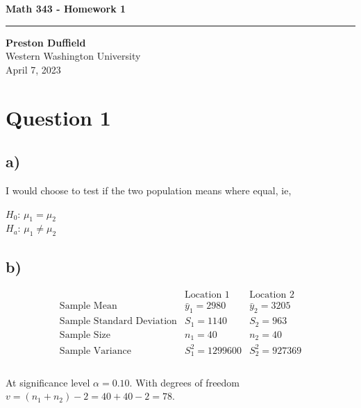 \documentclass{article}
\begin{document}
\noindent
\begin{minipage}[t]{0.6\textwidth}
    \begin{flushleft}
        \LARGE\textbf{Math 343 - Homework 1} \\
        \vspace{6pt} %
        \hrule width 10cm
        \vspace{12pt}
        \large\textbf{Preston Duffield} \\
        \large Western Washington University \\
        April 7, 2023
        \vspace{24pt}
    \end{flushleft}
\end{minipage}


\section*{Question 1}

\subsection*{a)}
I would choose to test if the two population means where equal, ie,
\begin{flushleft}
    $H_0$: $\mu_1 = \mu_2$ \\
    $H_a$: $\mu_1 \neq \mu_2$ \\
\end{flushleft}
\subsection*{b)}
\begin{equation*}
    \begin{array}{c|c|c}
        & \text{Location 1} & \text{Location 2} \\
        \hline
        \text{Sample Mean} & \bar{y}_1 = 2980 & \bar{y}_2 = 3205 \\
        \text{Sample Standard Deviation} & S_1 = 1140 & S_2 = 963 \\
        \text{Sample Size} & n_1 = 40 & n_2 = 40 \\
        \text{Sample Variance} & S_1^2 = 1299600 & S_2^2 = 927369 \\
    \end{array}
\end{equation*}\\

At significance level $\alpha = 0.10$. With degrees of freedom $v = (n_1 + n_2) - 2 = 40 + 40 - 2 = 78$.
\end{document}
